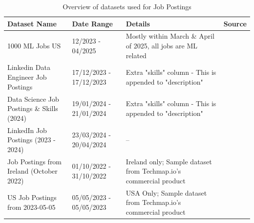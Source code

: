 \begin{table}[ht]
    \hskip-2.0cm
    \caption{Overview of datasets used for Job Postings}
    \label{table:job-data-overview}
    \small
    \centering
    \renewcommand{\arraystretch}{1.5}
    \begin{tabular}{p{3.5cm} p{3cm} p{6.5cm} p{2cm}}
        \textbf{Dataset Name}                      & \textbf{Date Range}     & \textbf{Details}                                                  & \textbf{Source}           \\
        \hline
        1000 ML Jobs US                            & 12/2023 - 04/2025       & Mostly within March \& April of 2025, all jobs are ML related     & \cite{__MachineLearninga} \\
        Linkedin Data Engineer Job Postings        & 17/12/2023 - 17/12/2023 & Extra "skills" column - This is appended to "description"         & \cite{asaniczka_2023}     \\
        Data Science Job Postings \& Skills (2024) & 19/01/2024 - 21/01/2024 & Extra "skills" column - This is appended to "description"         & \cite{asaniczka_2024}     \\
        LinkedIn Job Postings (2023 - 2024)        & 23/03/2024 - 20/04/2024 & --                                                                & \cite{arsh_koneru_2024}   \\
        Job Postings from Ireland (October 2022)   & 01/10/2022 - 31/10/2022 & Ireland only; Sample dataset from Techmap.io's commercial product & \cite{__JobPostings}      \\
        US Job Postings from 2023-05-05            & 05/05/2023 - 05/05/2023 & USA Only; Sample dataset from Techmap.io's commercial product     & \cite{__USJoba}           \\
    \end{tabular}
\end{table}